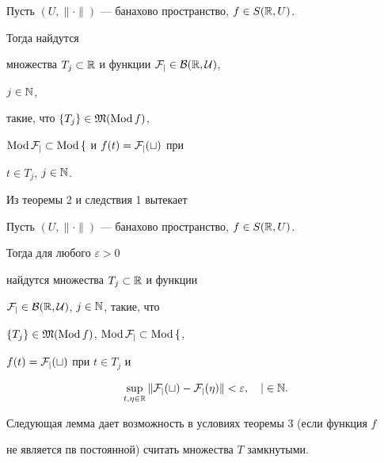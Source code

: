 \addtocounter{cor}{-1}





\begin{cor}


Пусть $(U,\|\cdot\|)$ --- банахово пространство, $f\in S(\Bbb R,U)$.


Тогда найдутся


множества $T_j\subset\Bbb R$ и функции $\cal F_j\in B(\Bbb R,U)$,


$j\in\Bbb N$,


такие, что $\{T_j\}\in\frak M(\operatorname{Mod} f)$,


$\operatorname{Mod} \cal F_j\subset\operatorname{Mod} f$ и $f(t)=\cal F_j(t)$ при


$t\in T_j$, $j\in\Bbb N$.


\end{cor}





Из теоремы 2 и следствия 1 вытекает





\begin{cor}


Пусть $(U,\|\cdot\|)$ --- банахово пространство, $f\in S(\Bbb R,U)$.


Тогда для любого $\varepsilon>0$


найдутся множества $T_j\subset\Bbb R$ и функции


$\cal F_j\in B(\Bbb R,U)$, $j\in\Bbb N$, такие, что


$\{T_j\}\in\frak M(\operatorname{Mod} f)$, $\operatorname{Mod}\cal F_j\subset\operatorname{Mod} f$,


$f(t)=\cal F_j(t)$ при $t\in T_j$ и


$$


\sup_{t,\eta\in\Bbb R}\|\cal F_j(t)-\cal F_j(\eta)\|<\varepsilon,


\quad j\in\Bbb N.


$$


\end{cor}





Следующая лемма дает возможность в условиях теоремы 3 (если функция $f$


не является пв постоянной) считать множества $T$ замкнутыми.






